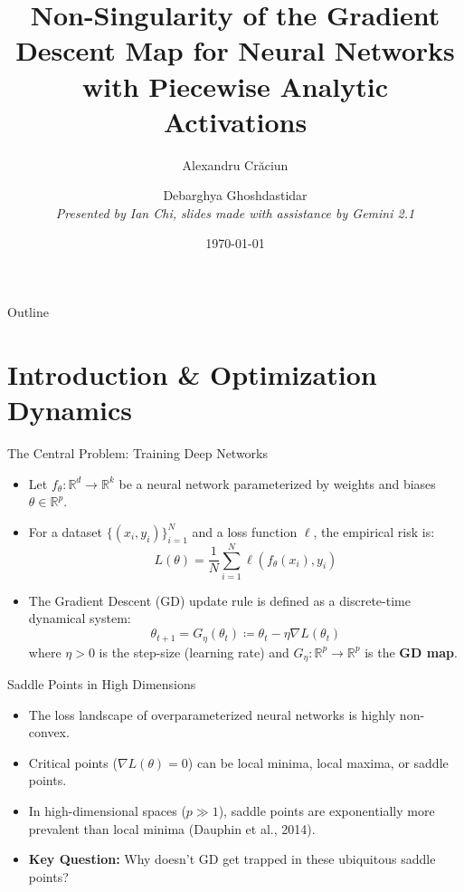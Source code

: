 \documentclass[10pt, aspectratio=169]{beamer}
\title[Non-Singularity of the GD Map]{Non-Singularity of the Gradient Descent Map for Neural Networks with Piecewise Analytic Activations}
\author[A. Crăciun \& D. Ghoshdastidar]{Alexandru Crăciun \and Debarghya Ghoshdastidar \\ \vspace{0.3cm} \small \textit{Presented by Ian Chi, slides made with assistance by Gemini 2.1}}
\institute[NeurIPS 2025]{39th Conference on Neural Information Processing Systems (NeurIPS 2025)}
\date{\today}
\theoremstyle{definition}
\begin{document}

\begin{frame}
    \titlepage
\end{frame}

\begin{frame}{Outline}
    \tableofcontents[hideallsubsections]
\end{frame}

\section{Introduction \& Optimization Dynamics}

\begin{frame}{The Central Problem: Training Deep Networks}
    \begin{itemize}
        \item Let $f_\theta: \mathbb{R}^d \to \mathbb{R}^k$ be a neural network parameterized by weights and biases $\theta \in \mathbb{R}^p$.
        \item For a dataset $\{(x_i, y_i)\}_{i=1}^N$ and a loss function $\ell$, the empirical risk is:
        \begin{equation*}
            L(\theta) = \frac{1}{N} \sum_{i=1}^N \ell(f_\theta(x_i), y_i)
        \end{equation*}
        \item The Gradient Descent (GD) update rule is defined as a discrete-time dynamical system:
        \begin{equation*}
            \theta_{t+1} = G_\eta(\theta_t) \coloneqq \theta_t - \eta \nabla L(\theta_t)
        \end{equation*}
        where $\eta > 0$ is the step-size (learning rate) and $G_\eta: \mathbb{R}^p \to \mathbb{R}^p$ is the \textbf{GD map}.
    \end{itemize}
\end{frame}

\begin{frame}{Saddle Points in High Dimensions}
    \begin{itemize}
        \item The loss landscape of overparameterized neural networks is highly non-convex.
        \item Critical points ($\nabla L(\theta) = 0$) can be local minima, local maxima, or saddle points.
        \item In high-dimensional spaces ($p \gg 1$), saddle points are exponentially more prevalent than local minima (Dauphin et al., 2014).
        \item \textbf{Key Question:} Why doesn't GD get trapped in these ubiquitous saddle points?
    \end{itemize}
\end{frame}
\end{document}
